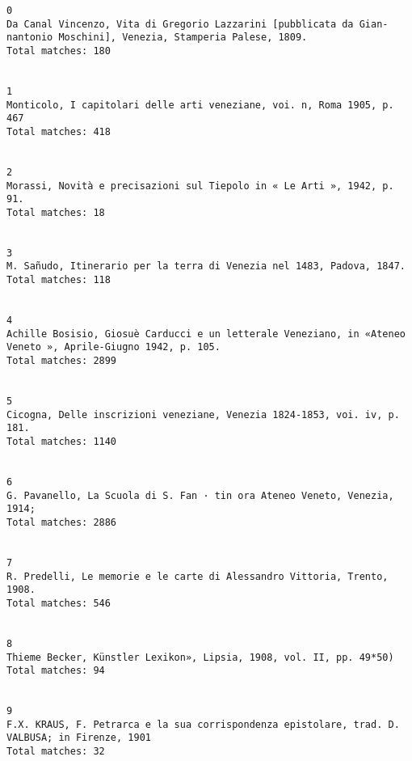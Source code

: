 \documentclass[11pt]{article}
\begin{document}
    \begin{Verbatim}[commandchars=\\\{\}]
0
Da Canal Vincenzo, Vita di Gregorio Lazzarini [pubblicata da Gian- nantonio Moschini], Venezia, Stamperia Palese, 1809.
Total matches: 180


1
Monticolo, I capitolari delle arti veneziane, voi. n, Roma 1905, p. 467
Total matches: 418


2
Morassi, Novità e precisazioni sul Tiepolo in « Le Arti », 1942, p. 91.
Total matches: 18


3
M. Sañudo, Itinerario per la terra di Venezia nel 1483, Padova, 1847.
Total matches: 118


4
Achille Bosisio, Giosuè Carducci e un letterale Veneziano, in «Ateneo Veneto », Aprile-Giugno 1942, p. 105.
Total matches: 2899


5
Cicogna, Delle inscrizioni veneziane, Venezia 1824-1853, voi. iv, p. 181.
Total matches: 1140


6
G. Pavanello, La Scuola di S. Fan · tin ora Ateneo Veneto, Venezia, 1914;
Total matches: 2886


7
R. Predelli, Le memorie e le carte di Alessandro Vittoria, Trento, 1908.
Total matches: 546


8
Thieme Becker, Künstler Lexikon», Lipsia, 1908, vol. II, pp. 49*50)
Total matches: 94


9
F.X. KRAUS, F. Petrarca e la sua corrispondenza epistolare, trad. D. VALBUSA; in Firenze, 1901
Total matches: 32



    \end{Verbatim}
\end{document}
